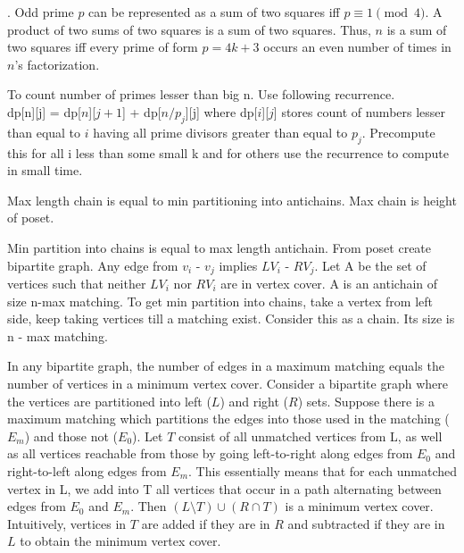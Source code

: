 .  Odd prime $p$ can be represented
as a sum of two squares iff $p \equiv 1 {\pmod 4}$.
A product of two sums of two squares is a sum of two squares.
Thus, $n$ is a sum of two squares iff every prime of
form $p=4k+3$ occurs an even number of times in $n$'s factorization.
 
   To count number of primes lesser than big n. Use following recurrence. \\ dp[n][j] = dp[$n$][$j+1$] + dp[$n/p_{j}$][j]   where dp[$i$][$j$] stores count of numbers lesser than equal to $i$ having all prime divisors greater than equal to $p_{j}$. Precompute this for all i less than some small k and for others use the recurrence to compute in small time.

\vspace{-7mm}
\vspace{-3mm}
 Max length chain is equal to min partitioning into antichains. Max chain is height of poset.
\vspace{-3mm}
 
 Min partition into chains is equal to max length antichain. From poset create bipartite graph. Any edge from $v_{i}$ - $v_{j}$ implies  $LV_{i}$ - $RV_{j}$. Let A be the set of vertices such that neither $LV_{i}$ nor $RV_{i}$ are in vertex cover. A is an antichain of size n-max matching. To get min partition into chains, take a vertex from left side, keep taking vertices till a matching exist. Consider this as a chain. Its size is n - max matching.
\vspace{-3mm}
 
 In any bipartite graph, the number of edges in a maximum matching equals the number of vertices in a minimum vertex cover.
Consider a bipartite graph where the vertices are partitioned into left ($L$) and right ($R$) sets. Suppose there is a maximum matching which partitions the edges into those used in the matching ($E_m$) and those not ($E_0$). Let $T$ consist of all unmatched vertices from L, as well as all vertices reachable from those by going left-to-right along edges from $E_0$ and right-to-left along edges from $E_m$. This essentially means that for each unmatched vertex in L, we add into T all vertices that occur in a path alternating between edges from $E_0$ and $E_m$.
Then $(L \setminus T) \cup (R \cap T)$ is a minimum vertex cover. Intuitively, vertices in $T$ are added if they are in $R$ and subtracted if they are in $L$ to obtain the minimum vertex cover.
\vspace{-3mm}
 

